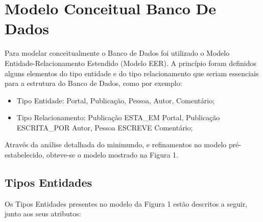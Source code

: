 \documentclass{article}
\begin{document}
\section{Modelo Conceitual Banco De Dados}

Para modelar conceitualmente o Banco de Dados foi utilizado o Modelo Entidade-Relacionamento Estendido (Modelo EER). A princípio foram definidos alguns elementos do tipo entidade e do tipo relacionamento que seriam essenciais para a estrutura do Banco de Dados, como por exemplo:

\begin{itemize}
				\item Tipo Entidade: Portal, Publicação, Pessoa, Autor, Comentário; 

				\item  Tipo Relacionamento: Publicação ESTA\_EM Portal, Publicação ESCRITA\_POR Autor, Pessoa ESCREVE Comentário;
\end{itemize}

Através da análise detalhada do minimundo, e refinamentos no modelo pré-estabelecido, obteve-se o modelo mostrado na Figura 1.


\subsection{Tipos Entidades}

Os Tipos Entidades presentes no modelo da Figura 1 estão descritos a seguir, junto aos seus atributos:
\end{document}
